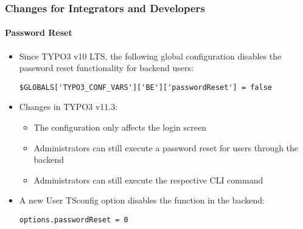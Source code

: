 %

\begin{frame}[fragile]
	\frametitle{Changes for Integrators and Developers}
	\framesubtitle{Password Reset}


	\begin{itemize}
		\item Since TYPO3 v10 LTS, the following global configuration disables
			the password reset functionality for backend users:
\begin{lstlisting}
$GLOBALS['TYPO3_CONF_VARS']['BE']['passwordReset'] = false
\end{lstlisting}

		\item Changes in TYPO3 v11.3:

		 	\begin{itemize}
				\item The configuration only affects the login screen
				\item Administrators can still execute a password reset for users through the backend
				\item Administrators can still execute the respective CLI command
			\end{itemize}

		\item A new User TSconfig option disables the function in the backend:
\begin{lstlisting}
options.passwordReset = 0
\end{lstlisting}

	\end{itemize}

\end{frame}

